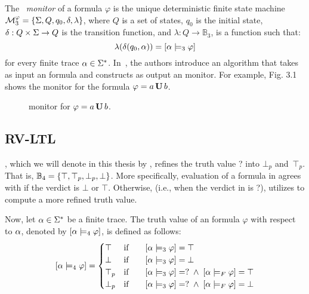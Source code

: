 The \LTLtri~{\em monitor} of a formula $\varphi$ is the unique deterministic 
finite state machine $\mathcal{M}^{\varphi}_3 = \{ \Sigma, Q, q_0, \delta, 
\lambda \}$, where $Q$ is a set of states, $q_0$ is the initial state, $\delta: Q 
\times \Sigma \to Q$ is the transition function, and $\lambda: Q 
\rightarrow \mathbb{B}_3$, is a function such that:
\[
\lambda(\delta(q_0, \alpha)) = \left[\alpha\models_3 \varphi\right]
\]
for every finite trace $\alpha  \in \Sigma^*$.
%
In~\cite{bls11}, the authors introduce an algorithm that takes as input an \LTL 
formula and constructs as output an \LTLtri monitor. For example, 
Fig. 3.1 shows the \LTLtri monitor for the \LTL formula $\varphi = a \, \mathbf{U} \, b$.




 \begin{figure}[H]
     \centering
  
   \caption{\LTLtri monitor for $\varphi = a \, \mathbf{U} \, b$.}
    \end{figure}
   \label{fig:LTL3}




\subsection{RV-LTL}


\RVLTL \cite{bls10}, which we will denote in this thesis by \LTLfour, refines 
the truth value ? into $\bot_p$ and~$\top_p$. That is, 
$\mathbb{B}_4=\{\top,{\top_p},{\bot_p},\bot\}$. More specifically, evaluation of 
a formula in \LTLfour agrees with \LTLtri if the verdict is $\bot$ or 
$\top$. Otherwise, (i.e., when the verdict in \LTLtri is ?), \LTLfour 
utilizes \FLTL to compute a more refined truth value.

Now, let $\alpha \in \Sigma^{*}$ be a finite trace. The truth value of an 
\LTLfour formula $\varphi$ with respect to $\alpha$, denoted by $[\alpha 
\models_4 \varphi]$, is defined as follows:
\begin{equation*}
 	\left[\alpha \models_{4} \varphi \right] = 
 		\begin{cases} \top & \text{if }~~~~~[\alpha \models_3 
\varphi] = \top\\
 		\bot & \text{if }~~~~~[\alpha \models_3 \varphi] = 
\bot\\
 		{\top_p} & \text{if }~~~~~[\alpha \models_3 \varphi] =? \; \wedge 
\; [\alpha \models_F \varphi] = \top\\ 

 		{\bot_p} & \text{if }~~~~~[\alpha \models_3 \varphi] =? \; \wedge 
\; [\alpha \models_F \varphi] = \bot\\ 
 	\end{cases}
 \end{equation*}




